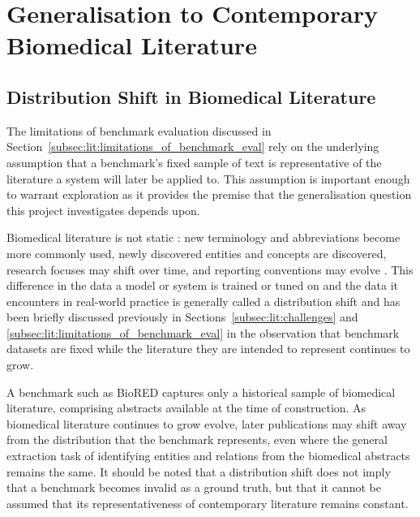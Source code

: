 \section{Generalisation to Contemporary Biomedical Literature}
\label{sec:lit:generalisation_to_contemporary_biomed_lit}

\subsection{Distribution Shift in Biomedical Literature}
\label{subsec:lit:distribution_shift_in_biomedical_literature}
The limitations of benchmark evaluation discussed in Section~\ref{subsec:lit:limitations_of_benchmark_eval} rely on the underlying assumption that a benchmark's fixed sample of text is representative of the literature a system will later be applied to. This assumption is important enough to warrant exploration as it provides the premise that the generalisation question this project investigates depends upon.

Biomedical literature is not static \cite{gonzalez2024_biomed_landscape,lu2011_pubmed_publicationrate}: new terminology and abbreviations become more commonly used, newly discovered entities and concepts are discovered, research focuses may shift over time, and reporting conventions may evolve \pref. This difference in the data a model or system is trained or tuned on and the data it encounters in real-world practice is generally called a distribution shift \cite{acevedo2024fairness} and has been briefly discussed previously in Sections~\ref{subsec:lit:challenges} and \ref{subsec:lit:limitations_of_benchmark_eval} in the observation that benchmark datasets are fixed while the literature they are intended to represent continues to grow.

A benchmark such as BioRED captures only a historical sample of biomedical literature, comprising abstracts available at the time of construction. As biomedical literature continues to grow evolve, later publications may shift away from the distribution that the benchmark represents, even where the general extraction task of identifying entities and relations from the biomedical abstracts remains the same. It should be noted that a distribution shift does not imply that a benchmark becomes invalid as a ground truth, but that it cannot be assumed that its representativeness of contemporary literature remains constant.

